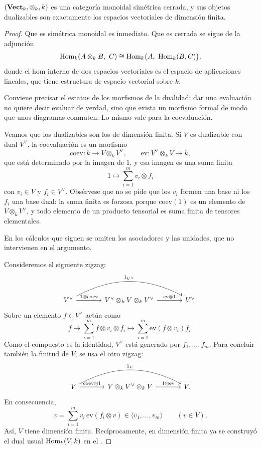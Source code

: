\begin{prop}\label{prop:vect}
$(\mathbf{Vect}_k,\otimes_k,k)$ es una categoría monoidal simétrica cerrada, y sus objetos dualizables son exactamente los espacios vectoriales de dimensión finita.
\end{prop}
\begin{proof}
Que es simétrica monoidal es inmediato. Que es cerrada se sigue de la adjunción
\[
\Hom_k(A\otimes_k B,\ C)\cong\Hom_k\bigl(A,\ \Hom_k(B,C)\bigr),
\]
donde el hom interno de dos espacios vectoriales es el espacio de aplicaciones lineales, que tiene estructura de espacio vectorial sobre $k$.

Conviene precisar el estatus de los morfismos de la dualidad: dar una evaluación no quiere decir evaluar de verdad, sino que exista un morfismo formal de modo que unos diagramas conmuten. Lo mismo vale para la coevaluación.

Veamos que los dualizables son los de dimensión finita. Si $V$ es dualizable con dual $V^\vee$, la coevaluación es un morfismo
\[
\mathrm{coev}\colon k\longrightarrow V\otimes_k V^\vee,
\qquad \mathrm{ev}\colon V^\vee\otimes_k V\longrightarrow k,
\]
que está determinado por la imagen de $1$, y esa imagen es una suma finita
\[
1\longmapsto\sum_{i=1}^{m}v_i\otimes f_i
\]
con $v_i\in V$ y $f_i\in V^\vee$. Obsérvese que no se pide que los $v_i$ formen una base ni los $f_i$ una base dual: la suma finita es forzosa porque $\mathrm{coev}(1)$ es un elemento de $V\otimes_k V^\vee$, y todo elemento de un producto tensorial es suma finita de tensores elementales.

En los cálculos que siguen se omiten los asociadores y las unidades, que no intervienen en el argumento.

Consideremos el siguiente zigzag:
\[
\begin{tikzcd}[column sep=large]
V^\vee \arrow[r,"{1\otimes\mathrm{coev}}"]
 \arrow[rr,bend left=28,"{1_{V^\vee}}"]
 &V^\vee\otimes_k V\otimes_k V^\vee
 \arrow[r,"{\mathrm{ev}\otimes1}"] &V^\vee .
\end{tikzcd}
\]
Sobre un elemento $f\in V^\vee$ actúa como
\[
f\longmapsto\sum_{i=1}^m f\otimes v_i\otimes f_i
\longmapsto\sum_{i=1}^m\mathrm{ev}(f\otimes v_i)f_i.
\]
Como el compuesto es la identidad, $V^\vee$ está generado por $f_1,\ldots,f_m$.
Para concluir también la finitud de $V$, se usa el otro zigzag:
\[
\begin{tikzcd}[column sep=large]
V \arrow[r,"{\mathrm{coev}\otimes1}"]
 \arrow[rr,bend left=28,"{1_V}"]
 &V\otimes_k V^\vee\otimes_k V
 \arrow[r,"{1\otimes\mathrm{ev}}"] &V .
\end{tikzcd}
\]
En consecuencia,
\[
v=\sum_{i=1}^m v_i\,\mathrm{ev}(f_i\otimes v)
\in\langle v_1,\ldots,v_m\rangle
\qquad(v\in V).
\]
Así, $V$ tiene dimensión finita. Recíprocamente, en dimensión finita ya se construyó el dual usual $\operatorname{Hom}_k(V,k)$ en el .
\end{proof}

